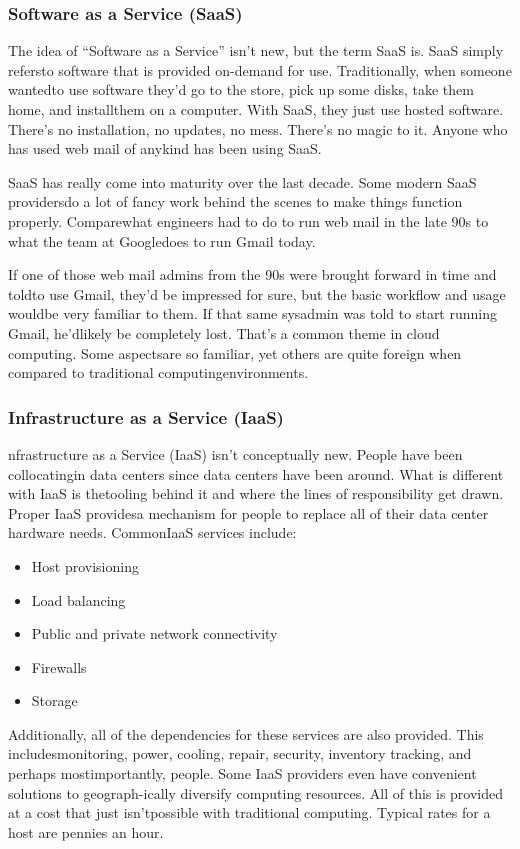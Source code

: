 \subsubsection*{Software as a Service (SaaS)}
The idea of “Software as a Service” isn’t new, but the term SaaS is. SaaS simply refersto software that is provided on-demand for use. Traditionally, when someone wantedto use software they’d go to the store, pick up some disks, take them home, and installthem on a computer. With SaaS, they just use hosted software. There’s no installation, no updates, no mess. There’s no magic to it. Anyone who has used web mail of anykind has been using SaaS.
\newline

SaaS has really come into maturity over the last decade. Some modern SaaS providersdo a lot of fancy work behind the scenes to make things function properly. Comparewhat engineers had to do to run web mail in the late 90s to what the team at Googledoes to run Gmail today.
\newline

If one of those web mail admins from the 90s were brought forward in time and toldto use Gmail, they’d be impressed for sure, but the basic workflow and usage wouldbe very familiar to them. If that same sysadmin was told to start running Gmail, he’dlikely be completely lost. That’s a common theme in cloud computing. Some aspectsare so familiar, yet others are quite foreign when compared to traditional computingenvironments.
\subsubsection*{Infrastructure as a Service (IaaS)}
nfrastructure as a Service (IaaS) isn’t conceptually new. People have been collocatingin data centers since data centers have been around. What is different with IaaS is thetooling behind it and where the lines of responsibility get drawn. Proper IaaS providesa mechanism for people to replace all of their data center hardware needs. CommonIaaS services include:
\begin{itemize}
	\item Host provisioning
	\item Load balancing
	\item Public and private network connectivity
	\item Firewalls
	\item Storage
\end{itemize}
Additionally, all of the dependencies for these services are also provided. This includesmonitoring, power, cooling, repair, security, inventory tracking, and perhaps mostimportantly, people. Some IaaS providers even have convenient solutions to geograph-ically diversify computing resources. All of this is provided at a cost that just isn’tpossible with traditional computing. Typical rates for a host are pennies an hour.
\newline

